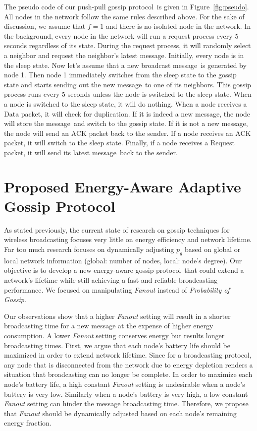 \documentclass[onehalf,11pt]{beavtex}
\newcommand{\gp}{gossip protocol}
\newcommand{\pog}{Probability of Gossip}
\newcommand{\msg}{message}
\begin{document}
The pseudo code of our push-pull \gp ~is given in Figure~\ref{fig:pseudo}. All nodes in the network follow the same rules described above. For the sake of discussion, we assume that $f=1$ and there is no isolated node in the network. In the background, every node in the network will run a request process every 5 seconds regardless of its state. During the request process, it will randomly select a neighbor and request the neighbor's latest \msg. Initially, every node is in the sleep state. Now let's assume that a new broadcast \msg ~is generated by node 1. Then node 1 immediately switches from the sleep state to the gossip state and starts sending out the new \msg ~to one of its neighbors. This gossip process runs every 5 seconds unless the node is switched to the sleep state. When a node is switched to the sleep state, it will do nothing. When a node receives a Data packet, it will check for duplication. If it is indeed a new \msg, the node will store the \msg ~and switch to the gossip state. If it is not a new \msg, the node will send an ACK packet back to the sender. If a node receives an ACK packet, it will switch to the sleep state. Finally, if a node receives a Request packet, it will send its latest \msg ~back to the sender. 

\section{Proposed Energy-Aware Adaptive Gossip Protocol}
As stated previously, the current state of research on gossip techniques for wireless broadcasting focuses very little on energy efficiency and network lifetime. Far too much research focuses on dynamically adjusting $p_g$ based on global or local network information (global: number of nodes, local: node's degree). Our objective is to develop a new energy-aware \gp ~that could extend a network's lifetime while still achieving a fast and reliable broadcasting performance. We focused on manipulating \emph{Fanout} instead of \emph{\pog}.

Our observations show that a higher \emph{Fanout} setting will result in a shorter broadcasting time for a new message at the expense of higher energy consumption. A lower \emph{Fanout} setting conserves energy but results longer broadcasting times. First, we argue that each node's battery life should be maximized in order to extend network lifetime. Since for a broadcasting protocol, any node that is disconnected from the network due to energy depletion renders a situation that broadcasting can no longer be complete. In order to maximize each node's battery life, a high constant \emph{Fanout} setting is undesirable when a node's battery is very low. Similarly when a node's battery is very high, a low constant \emph{Fanout} setting can hinder the message broadcasting time. Therefore, we propose that \emph{Fanout} should be dynamically adjusted based on each node's remaining energy fraction. 
\end{document}
